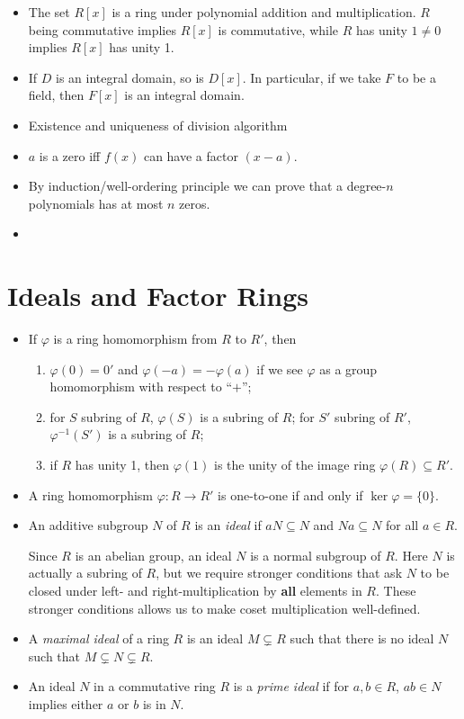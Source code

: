 \documentclass{article}
\renewcommand{\phi}{\varphi}
\begin{document}
\begin{itemize}
    
    
    \item The set $R[x]$ is a ring under polynomial addition and multiplication. $R$ being commutative implies $R[x]$ is commutative, while $R$ has unity $1 \not= 0$ implies $R[x]$ has unity 1.
    \item If $D$ is an integral domain, so is $D[x]$. In particular, if we take $F$ to be a field, then $F[x]$ is an integral domain.
    \item Existence and uniqueness of division algorithm
    \item $a$ is a zero iff $f(x)$ can have a factor $(x-a)$.
    \item By induction/well-ordering principle we can prove that a degree-$n$ polynomials has at most $n$ zeros.


    
    \item 
    
\end{itemize}
\section{Ideals and Factor Rings}
\begin{itemize}
    \item If $\phi$ is a ring homomorphism from $R$ to $R'$, then
    \begin{enumerate}[label=(\alph*)]
        \item $\phi(0) = 0'$ and $\phi(-a) = - \phi(a)$ if we see $\phi$ as a group homomorphism with respect to ``$+$'';
        \item for $S$ subring of $R$, $\phi(S)$ is a subring of $R$; for $S'$ subring of $R'$, $\phi^{-1}(S')$ is a subring of $R$;
        \item if $R$ has unity 1, then $\phi(1)$ is the unity of the image ring $\phi(R) \subseteq R'$.
    \end{enumerate}
    \item A ring homomorphism $\phi: R \to R'$ is one-to-one if and only if $\ker \phi = \{0\}$.
    \item An additive subgroup $N$ of $R$ is an \textit{ideal} if $aN \subseteq N$ and $Na \subseteq N$ for all $a \in R$.
    
    Since $R$ is an abelian group, an ideal $N$ is a normal subgroup of $R$. Here $N$ is actually a subring of $R$, but we require stronger conditions that ask $N$ to be closed under left- and right-multiplication by \textbf{all} elements in $R$. These stronger conditions allows us to make coset multiplication well-defined.



    
    \item A \textit{maximal ideal} of a ring $R$ is an ideal $M \subsetneq R$ such that there is no ideal $N$ such that $M \subsetneq N \subsetneq R$.
    \item An ideal $N$ in a commutative ring $R$ is a \textit{prime ideal} if for $a,b \in R$, $ab \in N$ implies either $a$ or $b$ is in $N$.
\end{itemize}
\end{document}

